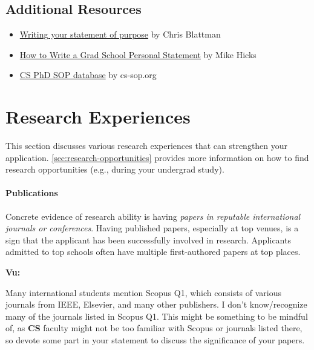 \documentclass[oneside,11pt,dvipsnames]{book}
\newenvironment{commentbox}[1][]{
  \small
  \begin{mybox}
    {\small \textbf{#1}}
  }{
  \end{mybox}
}
\begin{document}
\subsection*{Additional Resources}
\begin{itemize}
    \item \href{https://chrisblattman.com/blog/2022/01/11/}{Writing your statement of purpose} by Chris Blattman
  \item \href{http://www.pl-enthusiast.net/2022/10/03/how-to-write-a-grad-school-personal-statement/}{How to Write a Grad School Personal Statement} by Mike Hicks
  \item     \href{https://cs-sop.notion.site/cs-sop/CS-PhD-Statements-of-Purpose-df39955313834889b7ac5411c37b958d?p=f5d5980a71524ebaa4e6ae57266b847c&pm=s}{CS PhD SOP database} by cs-sop.org
\end{itemize}


\section{Research Experiences}\label{sec:research-experiences}

This section discusses various research experiences that can strengthen your application.
\autoref{sec:research-opportunities} provides more information on how to find research opportunities (e.g., during your undergrad study).

\paragraph{Publications} Concrete evidence of research ability is having \emph{papers in reputable international journals or conferences}.
Having published papers, especially at top venues, is a sign that the applicant has been successfully involved in research.  Applicants admitted to top schools often have multiple first-authored papers at top places.

\begin{commentbox}[Vu:]
  Many international students mention Scopus Q1, which consists of various journals from IEEE, Elsevier, and many other publishers.  I don't know/recognize many of the journals listed in Scopus Q1. This might be something to be mindful of, as \textbf{CS} faculty might not be too familiar with Scopus or journals listed there, so devote some part in your statement to discuss the significance of your papers.
\end{commentbox}
\end{document}
